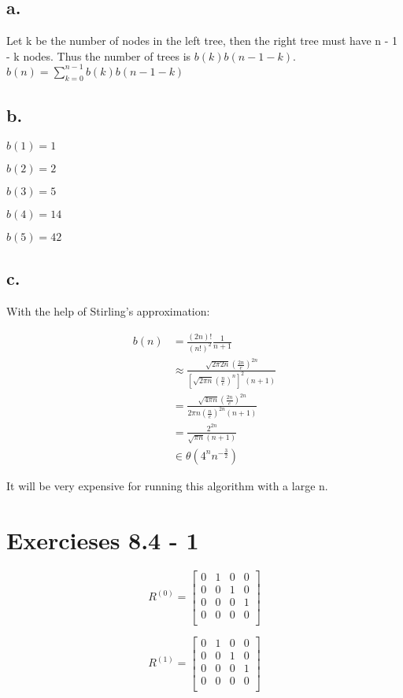 \documentclass{article}
\begin{document}
\subsection*{a.}

Let k be the number of nodes in the left tree, then the right tree must have n - 1 - k nodes. Thus the number of trees is $b(k)b(n-1-k)$. $b(n) = \sum_{k=0}^{n-1}b(k)b(n-1-k)$

\subsection*{b.}

$b(1) = 1$

$b(2) = 2$

$b(3) = 5$

$b(4) = 14$

$b(5) = 42$

\subsection*{c.}

With the help of Stirling's approximation:

\begin{align*}
b(n) &= \frac{(2n)!}{(n!)^2} \frac{1}{n+1} \\
&\approx \frac{\sqrt{2\pi 2n }(\frac{2n}{e})^{2n}}{[\sqrt{2\pi n}(\frac{n}{e})^n]^2(n+1)}\\
&= \frac{\sqrt{4\pi n}(\frac{2n}{e})^{2n}}{2\pi n(\frac{n}{e})^{2n}(n+1)}\\
&= \frac{2^{2n}}{\sqrt{\pi n}(n+1)}\\
&\in \theta(4^nn^{-\frac{3}{2}})
\end{align*}

It will be very expensive for running this algorithm with a large n.

\section{Exercieses 8.4 - 1}

\[
R^{(0)} = 
\left[
\begin{array}{cccc}
0 & 1 & 0 & 0 \\
0 & 0 & 1 & 0 \\
0 & 0 & 0 & 1 \\
0 & 0 & 0 & 0 \\
\end{array}
\right]
\]

\[
R^{(1)} = 
\left[
\begin{array}{cccc}
0 & 1 & 0 & 0 \\
0 & 0 & 1 & 0 \\
0 & 0 & 0 & 1 \\
0 & 0 & 0 & 0 \\
\end{array}
\right]
\]
\end{document}
